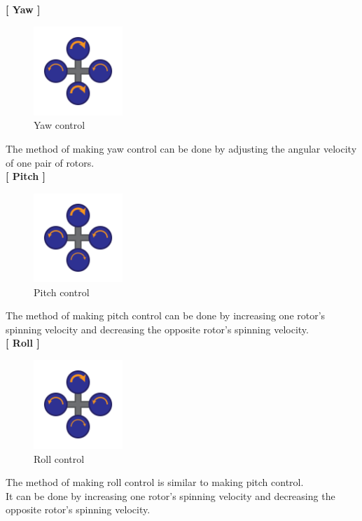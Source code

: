 \textbf{[ Yaw ]}\\
\begin{figure}[H]
  
  \centering
    \includegraphics[width=0.3\textwidth]{./Pictures/yaw.png}
    \caption{Yaw control}
\end{figure}
The method of making yaw control can be done by adjusting the angular velocity of one pair of rotors.\\
\textbf{[ Pitch ]}\\
\begin{figure}[H]
  
  \centering
    \includegraphics[width=0.3\textwidth]{./Pictures/pitch.png}
    \caption{Pitch control}
\end{figure}
The method of making pitch control can be done by increasing one rotor's spinning velocity and decreasing the opposite rotor's spinning velocity.\\
\textbf{[ Roll ]}\\
\begin{figure}[H]
  
  \centering
    \includegraphics[width=0.3\textwidth, angle=90]{./Pictures/pitch.png}
    \caption{Roll control}
\end{figure}
The method of making roll control is similar to making pitch control.\\
It can be done by increasing one rotor's spinning velocity and decreasing the opposite rotor's spinning velocity.\\

